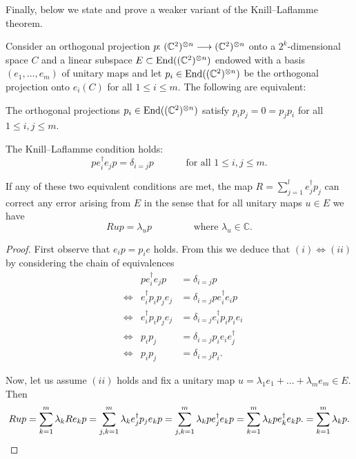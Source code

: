 \documentclass[a4paper, oneside, 12pt]{amsart}
\begin{document}
Finally, below we state and prove a weaker variant of the Knill--Laflamme theorem.
\begin{theorem}\label{thm:Knill-Laflamme}
  Consider an orthogonal projection \(p \from (\mathbb{C}^{2})^{\otimes n} \to (\mathbb{C}^{2})^{\otimes n}\) onto a \(2^{k}\)-dimensional space \(C\) and a linear subspace \(E \subset \operatorname{End}((\mathbb{C}^{2})^{\otimes n})\) endowed with a basis \((e_{1}, \dots , e_{m})\) of unitary maps and let \(p_{i} \in \operatorname{End}((\mathbb{C}^{2})^{\otimes n})\) be the orthogonal projection onto \(e_{i}(C)\) for all \(1\leq i \leq m\).
  The following are equivalent:
  \begin{thmlist}
    \item The orthogonal projections \(p_{i} \in \operatorname{End}((\mathbb{C}^{2})^{\otimes n})\)
    satisfy \(p_{i}p_{j} = 0 = p_{j} p_{i}\) for all \(1\leq i,j \leq m\).
    \item The Knill--Laflamme condition holds:
    \begin{equation}
      p e_{i}^{\dagger} e_{j} p = \delta_{i=j} p \qquad\quad \text{ for all } 1\leq i,j \leq m.
    \end{equation}
  \end{thmlist}
  If any of these two equivalent conditions are met, the map \(R = \sum_{j=1}^{l} e_{j}^{\dagger}p_{j}\) can correct any error arising from \(E\) in the sense that for all unitary maps \(u\in E\) we have
  \begin{equation*}
    Rup = \lambda_{u}p \qquad\qquad \text{ where }\lambda_{u}\in \mathbb{C} .
  \end{equation*}
\end{theorem}
\begin{proof}
  First observe that  \(e_{i}p = p_{i}e\) holds.
  From this we deduce that \((i) \iff (ii)\) by considering the chain of equivalences
  \begin{align*}
    && p e_{i}^{\dagger} e_{j} p & = \delta_{i = j}p \\
    & \iff & e_{i}^{\dagger}p_{i}p_{j} e_{j} & = \delta_{i = j}pe_{i}^{\dagger} e_{i} p \\
    & \iff & e_{i}^{\dagger}p_{i}p_{j} e_{j} & = \delta_{i = j}e_{i}^{\dagger}p_{i} p_{i} e_{i} \\
    & \iff & p_{i}p_{j}  & = \delta_{i = j} p_{i} e_{i}e_{j}^{\dagger} \\
    & \iff & p_{i}p_{j}  & = \delta_{i = j} p_{i}.
  \end{align*}

  Now, let us assume \((ii)\) holds and fix a unitary map \(u= \lambda_{1}e_{1}+ \dots + \lambda_{m}e_{m}\in E\).
  Then
  \begin{equation*}
    Rup
    = \sum_{k=1}^{m} \lambda_{k}R e_{k}p
    = \sum_{j,k=1}^{m} \lambda_{k}e_{j}^{\dagger} p_{j} e_{k}p
    = \sum_{j,k=1}^{m} \lambda_{k}pe_{j}^{\dagger} e_{k}p
    = \sum_{k=1}^{m} \lambda_{k}p e^{\dagger}_{k} e_{k}p.
    = \sum_{k=1}^{m} \lambda_{k}p. \qedhere
  \end{equation*}
\end{proof}
\end{document}
